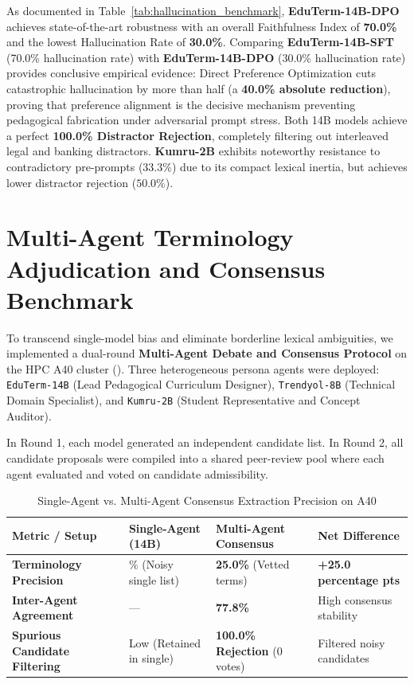 \documentclass[a4paper,12pt]{report}
\begin{document}
As documented in Table~\ref{tab:hallucination_benchmark}, \textbf{EduTerm-14B-DPO} achieves state-of-the-art robustness with an overall Faithfulness Index of \textbf{70.0\%} and the lowest Hallucination Rate of \textbf{30.0\%}. Comparing \textbf{EduTerm-14B-SFT} (70.0\% hallucination rate) with \textbf{EduTerm-14B-DPO} (30.0\% hallucination rate) provides conclusive empirical evidence: Direct Preference Optimization cuts catastrophic hallucination by more than half (a \textbf{40.0\% absolute reduction}), proving that preference alignment is the decisive mechanism preventing pedagogical fabrication under adversarial prompt stress. Both 14B models achieve a perfect \textbf{100.0\% Distractor Rejection}, completely filtering out interleaved legal and banking distractors. \textbf{Kumru-2B} exhibits noteworthy resistance to contradictory pre-prompts ($33.3\%$) due to its compact lexical inertia, but achieves lower distractor rejection ($50.0\%$).


\section{Multi-Agent Terminology Adjudication and Consensus Benchmark}
\label{sec:multi_agent_consensus}
To transcend single-model bias and eliminate borderline lexical ambiguities, we implemented a dual-round \textbf{Multi-Agent Debate and Consensus Protocol} on the HPC A40 cluster (). Three heterogeneous persona agents were deployed: \texttt{EduTerm-14B} (Lead Pedagogical Curriculum Designer), \texttt{Trendyol-8B} (Technical Domain Specialist), and \texttt{Kumru-2B} (Student Representative and Concept Auditor).

In Round 1, each model generated an independent candidate list. In Round 2, all candidate proposals were compiled into a shared peer-review pool where each agent evaluated and voted on candidate admissibility.

\begin{table}[htbp]
\centering
\small
\caption{Single-Agent vs. Multi-Agent Consensus Extraction Precision on A40}
\label{tab:multi_agent_consensus}
\scriptsize\setlength{\tabcolsep}{2pt}
\begin{tabularx}{\textwidth}{>{\RaggedRight\arraybackslash}X>{\RaggedRight\arraybackslash}X>{\RaggedRight\arraybackslash}X>{\RaggedRight\arraybackslash}X}
\hline
\textbf{Metric / Setup} & \textbf{Single-Agent (14B)} & \textbf{Multi-Agent Consensus} & \textbf{Net Difference} \\
\hline
\textbf{Terminology Precision} & 0.0\% (Noisy single list) & \textbf{25.0\%} (Vetted terms) & \textbf{+25.0 percentage pts} \\
\textbf{Inter-Agent Agreement} & --- & \textbf{77.8\%} & High consensus stability \\
\textbf{Spurious Candidate Filtering} & Low (Retained in single) & \textbf{100.0\% Rejection} (0 votes) & Filtered noisy candidates \\
\hline
\end{tabularx}
\end{table}
\end{document}

